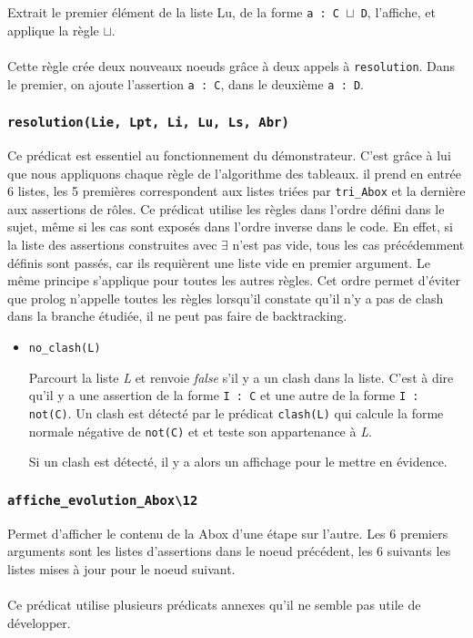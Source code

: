 \documentclass{article}
\newcommand{\code}[1]{\colorbox{light-gray}{\texttt{#1}}}
\begin{document}
Extrait le premier élément de la liste Lu, de la forme \code{a : C $\sqcup$ D}, l'affiche, et applique la règle $\sqcup$.
\\\\
Cette règle crée deux nouveaux noeuds grâce à deux appels à \code{resolution}. Dans le premier, on ajoute l'assertion \code{a : C}, dans le deuxième \code{a : D}.

\subsubsection{\code{resolution(Lie, Lpt, Li, Lu, Ls, Abr)}}

Ce prédicat est essentiel au fonctionnement du démonstrateur. C'est grâce à lui que nous appliquons chaque règle de l'algorithme des tableaux. il prend en entrée 6 listes, les 5 premières correspondent aux listes triées par \code{tri\_Abox} et la dernière aux assertions de rôles. Ce prédicat utilise les règles dans l'ordre défini dans le sujet, même si les cas sont exposés dans l'ordre inverse dans le code. En effet, si la liste des assertions construites avec $\exists$ n'est pas vide, tous les cas précédemment définis sont passés, car ils requièrent une liste vide en premier argument. Le même principe s'applique pour toutes les autres règles. Cet ordre permet d'éviter que prolog n'appelle toutes les règles lorsqu'il constate qu'il n'y a pas de clash dans la branche étudiée, il ne peut pas faire de backtracking.

\begin{itemize}
    \item \code{no\_clash(L)}

    Parcourt la liste \textit{L} et renvoie \textit{false} s'il y a un clash dans la liste. C'est à dire qu'il y a une assertion de la forme \code{I : C} et une autre de la forme \code{I :  not(C)}. Un clash est détecté par le prédicat \code{clash(L)} qui calcule la forme normale négative de \code{not(C)} et et teste son appartenance à \textit{L}. 

    Si un clash est détecté, il y a alors un affichage pour le mettre en évidence.
\end{itemize}

\subsubsection{\code{affiche\_evolution\_Abox\textbackslash12}}

Permet d'afficher le contenu de la Abox d'une étape sur l'autre. Les 6 premiers arguments sont les listes d'assertions dans le noeud précédent, les 6 suivants les listes mises à jour pour le noeud suivant.
\\\\
Ce prédicat utilise plusieurs prédicats annexes qu'il ne semble pas utile de développer.


\end{document}
